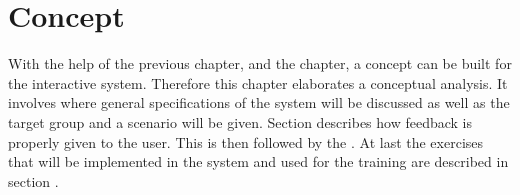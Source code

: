 \chapter{Concept}

With the help of the previous \textbf{} chapter, and the \textbf{} chapter, a concept can be built for the interactive system. Therefore this chapter elaborates a conceptual analysis. It involves \textbf{} where general specifications of the system will be discussed as well as the target group and a scenario will be given. Section \textbf{} describes how feedback is properly given to the user. This is then followed by the \textbf{}. At last the exercises that will be implemented in the system and used for the training are described in section \textbf{}.


